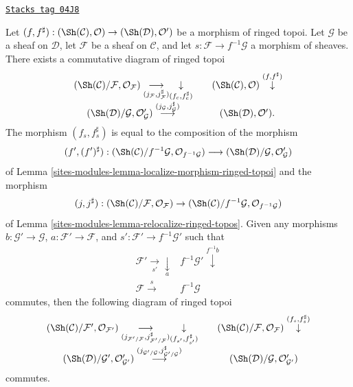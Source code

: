 \begin{lemma}
\label{sites-modules-lemma-relocalize-morphism-ringed-topoi}
\href{https://stacks.math.columbia.edu/tag/04J8}{\texttt{Stacks tag 04J8}}

Let
$(f, f^\sharp) :
(\Sh(\mathcal{C}), \mathcal{O})
\to
(\Sh(\mathcal{D}), \mathcal{O}')$
be a morphism of ringed topoi.
Let $\mathcal{G}$ be a sheaf on $\mathcal{D}$,
let $\mathcal{F}$ be a sheaf on $\mathcal{C}$,
and let $s : \mathcal{F} \to f^{-1}\mathcal{G}$ a morphism of sheaves.
There exists a commutative diagram of ringed topoi
$$
\begin{array}{ccc}(\Sh(\mathcal{C})/\mathcal{F}, \mathcal{O}_\mathcal{F})
\underset{(j_\mathcal{F}, j_\mathcal{F}^\sharp)}{\longrightarrow}\underset{(f_c, f_c^\sharp)}{\downarrow} &  & (\Sh(\mathcal{C}), \mathcal{O})
\overset{(f, f^\sharp)}{\downarrow} \\ (\Sh(\mathcal{D})/\mathcal{G}, \mathcal{O}'_\mathcal{G})
\overset{(j_\mathcal{G}, j_\mathcal{G}^\sharp)}{\longrightarrow} &  & (\Sh(\mathcal{D}), \mathcal{O}').\end{array}
$$
The morphism $(f_s, f_s^\sharp)$
is equal to the composition of the morphism
$$
(f', (f')^\sharp) :
(\Sh(\mathcal{C})/f^{-1}\mathcal{G}, \mathcal{O}_{f^{-1}\mathcal{G}})
\longrightarrow
(\Sh(\mathcal{D})/{\mathcal{G}}, \mathcal{O}'_\mathcal{G})
$$
of
Lemma \ref{sites-modules-lemma-localize-morphism-ringed-topoi}
and the morphism
$$
(j, j^\sharp) :
(\Sh(\mathcal{C})/\mathcal{F}, \mathcal{O}_\mathcal{F})
\to
(\Sh(\mathcal{C})/f^{-1}\mathcal{G}, \mathcal{O}_{f^{-1}\mathcal{G}})
$$
of
Lemma \ref{sites-modules-lemma-relocalize-ringed-topos}.
Given any morphisms $b : \mathcal{G}' \to \mathcal{G}$,
$a : \mathcal{F}' \to \mathcal{F}$, and
$s' : \mathcal{F}' \to f^{-1}\mathcal{G}'$ such that
$$
\begin{array}{cc}\mathcal{F}' \underset{s'}{\longrightarrow}\underset{a}{\downarrow} & f^{-1}\mathcal{G}' \overset{f^{-1}b}{\downarrow} \\ \mathcal{F} \overset{s}{\longrightarrow} & f^{-1}\mathcal{G}\end{array}
$$
commutes, then the following diagram of ringed topoi
$$
\begin{array}{ccc}(\Sh(\mathcal{C})/\mathcal{F}', \mathcal{O}_{\mathcal{F}'})
\underset{(j_{\mathcal{F}'/\mathcal{F}}, j_{\mathcal{F}'/\mathcal{F}}^\sharp)}{\longrightarrow}\underset{(f_{s'}, f_{s'}^\sharp)}{\downarrow} &  & (\Sh(\mathcal{C})/\mathcal{F}, \mathcal{O}_\mathcal{F})
\overset{(f_s, f_s^\sharp)}{\downarrow} \\ (\Sh(\mathcal{D})/\mathcal{G}', \mathcal{O}'_{\mathcal{G}'})
\overset{(j_{\mathcal{G}'/\mathcal{G}}, j_{\mathcal{G}'/\mathcal{G}}^\sharp)}{\longrightarrow} &  & (\Sh(\mathcal{D})/\mathcal{G}, \mathcal{O}'_{\mathcal{G}'})\end{array}
$$
commutes.
\end{lemma}

